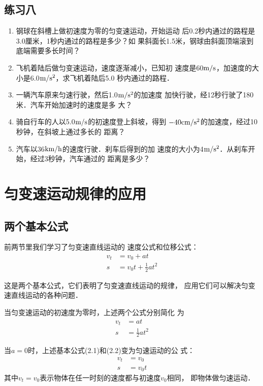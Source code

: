 \subsection*{练习八}
\begin{enumerate}
\item      钢球在斜槽上做初速度为零的匀变速运动，开始运动
后0.2秒内通过的路程是3.0厘米，1秒内通过的路程是多少？如
果斜面长1.5米，钢球由斜面顶端滚到底端需要多长时间？


\item     飞机着陆后做匀变速运动，速度逐渐减小，已知初
速度是60$\text{m}/\text{s}$，加速度的大小是6.0$\text{m}/\text{s}^2$，求飞机着陆后5.0
秒内通过的路程．


\item     一辆汽车原来匀速行驶，然后1.0$\text{m}/\text{s}^2$的加速度
加快行驶，经12秒行驶了180米．汽车开始加速时的速度是多
大？


\item     骑自行车的人以5.0$\text{m}/\text{s}$的初速度登上斜坡，得到
$-40{\rm cm}/{\rm s}^2$的加速度，经过10秒钟，在斜坡上通过多长的
距离？

\item    汽车以36$\text{km}/\text{h}$的速度行驶．刹车后得到的加
速度的大小为4$\text{m}/\text{s}^2$．从刹车开始，经过3秒钟，汽车通过的
距离是多少？


\end{enumerate}


\section{匀变速运动规律的应用}
    \subsection{两个基本公式}

前两节里我们学习了匀变速直线运动的
速度公式和位移公式：
\begin{align}
v_t&=v_0+at\\
s&=v_0 t+\frac{1}{2}at^2
\end{align}

    这是两个基本公式，它们表明了匀变速直线运动的规律，
应用它们可以解决匀变速直线运动的各种问题．

    当匀变速运动的初速度为零时，上述两个公式分别简化
为
\begin{align}
v_t&=at\\
s&=\frac{1}{2}at^2
\end{align}

当$a=0$时，上述基本公式(2.1)和(2.2)变为匀速运动的公
式：
\[\begin{split}
v_t&=v_0\\
s&=v_0t
\end{split}\]
其中$v_t=v_0$表示物体在任一时刻的速度都与初速度$v_0$相同，
即物体做匀速运动．

